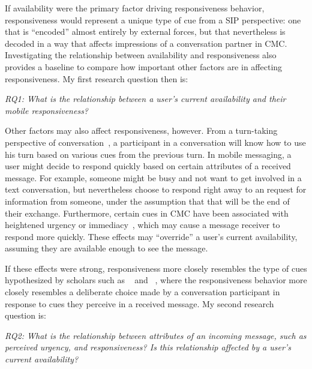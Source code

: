 \documentclass[12pt]{nuthesis}	%
\begin{document}
If availability were the primary factor driving responsiveness behavior, responsiveness would represent a unique type of cue from a SIP perspective: one that is ``encoded'' almost entirely by external forces, but that nevertheless is decoded in a way that affects impressions of a conversation partner in CMC. Investigating the relationship between availability and responsiveness also provides a baseline to compare how important other factors are in affecting responsiveness. My first research question then is:

\textit{RQ1: What is the relationship between a user's current availability and their mobile responsiveness?}

Other factors may also affect responsiveness, however. From a turn-taking perspective of conversation~\citep{sacks1974simplest}, a participant in a conversation will know how to use his turn based on various cues from the previous turn. In mobile messaging, a user might decide to respond quickly based on certain attributes of a received message. For example, someone might be busy and not want to get involved in a text conversation, but nevertheless choose to respond right away to an request for information from someone, under the assumption that that will be the end of their exchange. Furthermore, certain cues in CMC have been associated with heightened urgency or immediacy~\citep{nguyen2014lexical}, which may cause a message receiver to respond more quickly. These effects may ``override'' a user's current availability, assuming they are available enough to see the message.

If these effects were strong, responsiveness more closely resembles the type of cues hypothesized by scholars such as ~\citet{walther1995nonverbal} and ~\citet{kalman2006pauses}, where the responsiveness behavior more closely resembles a deliberate choice made by a conversation participant in response to cues they perceive in a received message. My second research question is:

\textit{RQ2: What is the relationship between attributes of an incoming message, such as perceived urgency, and responsiveness? Is this relationship affected by a user's current availability?}
\end{document}
